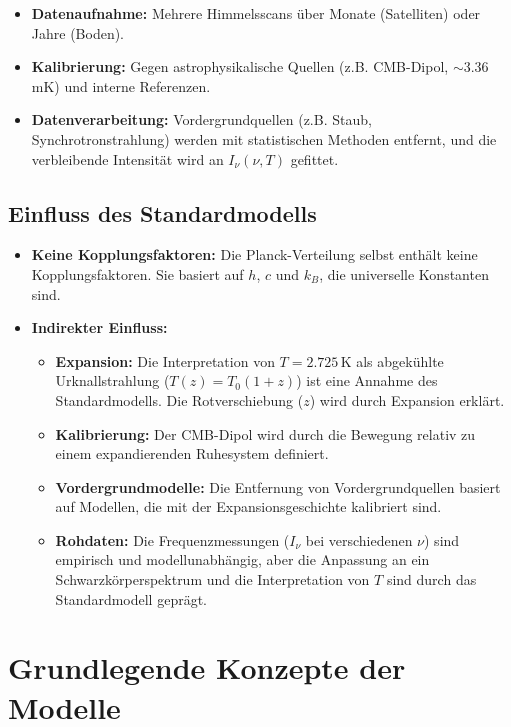 \documentclass[a4paper,12pt]{article}
\theoremstyle{definition}
\theoremstyle{remark}
\begin{document}
\begin{itemize}
	\item \textbf{Datenaufnahme:} Mehrere Himmelsscans über Monate (Satelliten) oder Jahre (Boden).
	\item \textbf{Kalibrierung:} Gegen astrophysikalische Quellen (z.B. CMB-Dipol, $\sim$3.36 mK) und interne Referenzen.
	\item \textbf{Datenverarbeitung:} Vordergrundquellen (z.B. Staub, Synchrotronstrahlung) werden mit statistischen Methoden entfernt, und die verbleibende Intensität wird an $I_\nu(\nu, T)$ gefittet.
\end{itemize}

\subsection{Einfluss des Standardmodells}

\begin{itemize}
	\item \textbf{Keine Kopplungsfaktoren:} Die Planck-Verteilung selbst enthält keine Kopplungsfaktoren. Sie basiert auf $h$, $c$ und $k_B$, die universelle Konstanten sind.
	\item \textbf{Indirekter Einfluss:}
	\begin{itemize}
		\item \textbf{Expansion:} Die Interpretation von $T = 2.725 \, \text{K}$ als abgekühlte Urknallstrahlung ($T(z) = T_0 (1 + z)$) ist eine Annahme des Standardmodells. Die Rotverschiebung ($z$) wird durch Expansion erklärt.
		\item \textbf{Kalibrierung:} Der CMB-Dipol wird durch die Bewegung relativ zu einem expandierenden Ruhesystem definiert.
		\item \textbf{Vordergrundmodelle:} Die Entfernung von Vordergrundquellen basiert auf Modellen, die mit der Expansionsgeschichte kalibriert sind.
		\item \textbf{Rohdaten:} Die Frequenzmessungen ($I_\nu$ bei verschiedenen $\nu$) sind empirisch und modellunabhängig, aber die Anpassung an ein Schwarzkörperspektrum und die Interpretation von $T$ sind durch das Standardmodell geprägt.
	\end{itemize}
\end{itemize}
	
	\section{Grundlegende Konzepte der Modelle}
	
\end{document}

